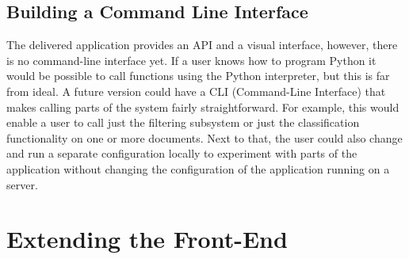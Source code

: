 \subsection{Building a Command Line Interface}
The delivered application provides an API and a visual interface, however, there is no command-line interface yet. If a user knows how to program Python it would be possible to call functions using the Python interpreter, but this is far from ideal. A future version could have a CLI (Command-Line Interface) that makes calling parts of the system fairly straightforward. For example, this would enable a user to call just the filtering subsystem or just the classification functionality on one or more documents. Next to that, the user could also change and run a separate configuration locally to experiment with parts of the application without changing the configuration of the application running on a server.

\section{Extending the Front-End}
